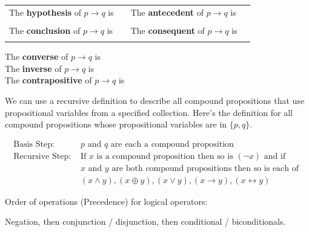 \documentclass[12pt, oneside]{article}
\begin{document}
\begin{tabular}{llll}
The {\bf  hypothesis}  of $p \to q$ is  &\underline{\phantom{\hspace{1in}}} &
The {\bf  antecedent}  of $p \to q$ is  &\underline{\phantom{\hspace{1in}}} \\
&&&  \\
The {\bf  conclusion}  of $p \to q$ is & \underline{\phantom{\hspace{1in}}}&
The {\bf  consequent}  of $p \to q$ is & \underline{\phantom{\hspace{1in}}}\\
&&&  \\
\end{tabular}
 

The {\bf converse}  of $p \to q$ is \underline{}\\

The {\bf inverse}  of $p \to q$ is \underline{}\\

The {\bf contrapositive}  of $p \to q$ is \underline{} \\
 \vfill


We can use a recursive definition to describe all 
compound propositions that use propositional variables 
from a specified collection.  Here's the definition
for all compound propositions whose propositional variables 
are in $\{p, q\}$.

\[
\begin{array}{ll}
\textrm{Basis Step: } & p \textrm{ and } q \textrm{ are each a compound proposition} \\
\textrm{Recursive Step: } & \textrm{If } x \textrm{ is a compound proposition then so is } (\lnot x) 
\textrm{ and if } \\
& x \textrm{ and } y \textrm{ are both compound propositions then so is each of }\\
&(x \land y), (x \oplus y), (x \lor y), (x \to y), (x \leftrightarrow y)
\end{array}
\] 

Order of operations (Precedence) for logical operators: 

Negation, then conjunction / disjunction, then conditional / biconditionals.
\end{document}
